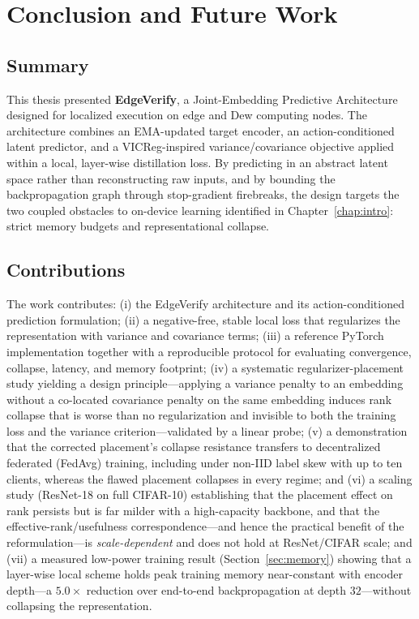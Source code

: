 \chapter{Conclusion and Future Work}
\label{chap:conclusion}

\section{Summary}
This thesis presented \textbf{EdgeVerify}, a Joint-Embedding Predictive
Architecture designed for localized execution on edge and Dew computing
nodes. The architecture combines an EMA-updated target encoder, an
action-conditioned latent predictor, and a VICReg-inspired
variance/covariance objective applied within a local, layer-wise
distillation loss. By predicting in an abstract latent space rather than
reconstructing raw inputs, and by bounding the backpropagation graph
through stop-gradient firebreaks, the design targets the two coupled
obstacles to on-device learning identified in Chapter~\ref{chap:intro}:
strict memory budgets and representational collapse.

\section{Contributions}
The work contributes: (i) the EdgeVerify architecture and its
action-conditioned prediction formulation; (ii) a negative-free, stable
local loss that regularizes the representation with variance and covariance
terms; (iii) a reference PyTorch implementation together with a
reproducible protocol for evaluating convergence, collapse, latency, and
memory footprint; (iv) a systematic regularizer-placement study yielding a
design principle---applying a variance penalty to an embedding without a
co-located covariance penalty on the same embedding induces rank collapse
that is worse than no regularization and invisible to both the training loss
and the variance criterion---validated by a linear probe; (v) a
demonstration that the corrected placement's collapse resistance transfers to
decentralized federated (FedAvg) training, including under non-IID label skew
with up to ten clients, whereas the flawed placement collapses in every regime;
and (vi) a scaling study (ResNet-18 on full CIFAR-10) establishing that the
placement effect on rank persists but is far milder with a high-capacity
backbone, and that the effective-rank/usefulness correspondence---and hence the
practical benefit of the reformulation---is \emph{scale-dependent} and does not
hold at ResNet/CIFAR scale; and (vii) a measured low-power training result
(Section~\ref{sec:memory}) showing that a layer-wise local scheme holds peak
training memory near-constant with encoder depth---a $5.0\times$ reduction over
end-to-end backpropagation at depth $32$---without collapsing the
representation.

